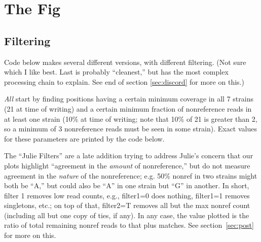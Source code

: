 \documentclass{article}\usepackage[]{graphicx}\usepackage[]{color}
\begin{document}
\section{The Fig}

\subsection{Filtering}\label{sec:filtering}
Code below makes several different versions, with different filtering.  (Not sure which I like best.  Last is probably ``cleanest,'' but has the most complex processing chain to explain.  See end of section \ref{sec:discord} for more on this.)

\emph{All} start by finding positions having a certain minimum coverage in all 7 strains (21 at time of writing) and a certain minimum fraction of nonreference reads in at least one strain (10\% at time of writing; note that 10\% of 21 is greater than 2, so a minimum of 3 nonreference reads must be seen in some strain).  Exact values for these parameters are printed by the code below.

The ``Julie Filters'' are a late addition trying to address Julie's concern that our plots highlight ``agreement in the \emph{amount} of nonreference,'' but do not measure agreement in the \emph{nature} of the nonreference; e.g. 50\% nonref in two strains might both be ``A,'' but could also be ``A'' in one strain but ``G'' in another.  In short, filter 1 removes low read counts, e.g., filter1=0 does nothing, filter1=1 removes singletons, etc.; on top of that, filter2=T removes all but the max nonref count (including all but one copy of ties, if any).  In any case, the value plotted is the ratio of total remaining nonref reads to that plus matches.
See section~\ref{sec:post} for more on this.
\end{document}
